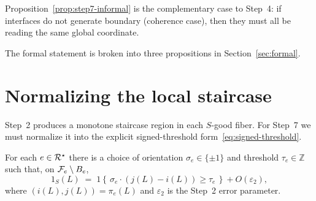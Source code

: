 \noindent
Proposition~\ref{prop:step7-informal} is the complementary case to
Step~4: if interfaces do not generate boundary (coherence case), then
they must all be reading the same global coordinate.

The formal statement is broken into three propositions in
Section~\ref{sec:formal}.

\section{Normalizing the local staircase}\label{sec:normalize}

Step~2 produces a monotone staircase region in each $S$-good fiber.
For Step~7 we must normalize it into the explicit signed-threshold
form~\eqref{eq:signed-threshold}.

\begin{lemma}\label{lem:signed-threshold}
For each $e\in\mathcal{R}^\star$ there is a choice of orientation
$\sigma_e\in\{\pm1\}$ and threshold $\tau_e\in\mathbb{Z}$ such that, on
$\mathcal{F}_{e}\setminus B_e$,
\[
  1_S(L) \;=\; 1\!\left\{\,\sigma_e\cdot (j(L)-i(L))\ge \tau_e\,\right\}
  + O(\varepsilon_2),
\]
where $(i(L),j(L))=\pi_e(L)$ and $\varepsilon_2$ is the Step~2 error
parameter.
\end{lemma}

